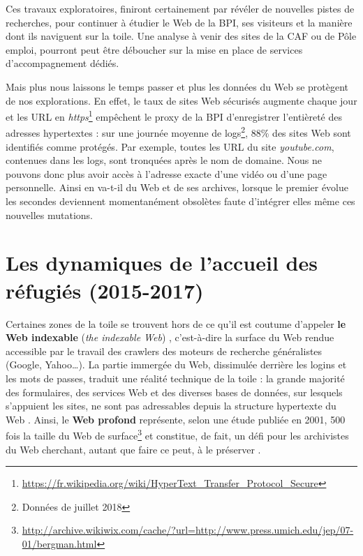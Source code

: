 \documentclass[symmetric,justified,marginals=raggedouter]{tufte-book}
\begin{document}
Ces travaux exploratoires, finiront certainement par révéler de nouvelles pistes de recherches, pour continuer à étudier le Web de la BPI, ses visiteurs et la manière dont ils naviguent sur la toile. Une analyse à venir des sites de la CAF ou de Pôle emploi, pourront peut être déboucher sur la mise en place de services d'accompagnement dédiés. 

Mais plus nous laissons le temps passer et plus les données du Web se protègent de nos explorations. En effet, le taux de sites Web sécurisés augmente chaque jour et les URL en \textit{https}\footnote{\RaggedOuter \url{https://fr.wikipedia.org/wiki/HyperText\_Transfer\_Protocol\_Secure}} empêchent le proxy de la BPI d'enregistrer l'entièreté des adresses hypertextes : sur une journée moyenne de logs\footnote{\RaggedOuter Données de juillet 2018}, $88\%$ des sites Web sont identifiés comme protégés. Par exemple, toutes les URL du site \textit{youtube.com}, contenues dans les logs, sont tronquées après le nom de domaine. Nous ne pouvons donc plus avoir accès à l'adresse exacte d'une vidéo ou d'une page personnelle. Ainsi en va-t-il du Web et de ses archives, lorsque le premier évolue les secondes deviennent momentanément obsolètes faute d'intégrer elles même ces nouvelles mutations. 

\section{Les dynamiques de l'accueil des réfugiés (2015-2017)} 
\label{sec:7_calm}

\noindent Certaines zones de la toile se trouvent hors de ce qu'il est coutume d'appeler \textbf{le Web indexable} (\textit{the indexable Web}) \citep{lawrence_searching_1998}, c'est-à-dire la surface du Web rendue accessible par le travail des crawlers des moteurs de recherche généralistes (Google, Yahoo\ldots{}). La partie immergée du Web, dissimulée derrière les logins et les mots de passes, traduit une réalité technique de la toile : la grande majorité des formulaires, des services Web et des diverses bases de données, sur lesquels s'appuient les sites, ne sont pas adressables depuis la structure hypertexte du Web \citep{senellart_comprendre_2007}. Ainsi, le \textbf{Web profond} \citep{bergman_white_2001} représente, selon une étude publiée en 2001, 500 fois la taille du Web de surface\footnote{\RaggedOuter \url{http://archive.wikiwix.com/cache/?url=http://www.press.umich.edu/jep/07-01/bergman.html}} et constitue, de fait, un défi pour les archivistes du Web cherchant, autant que faire ce peut, à le préserver \citep{masanes_archiving_2006}.
\end{document}
